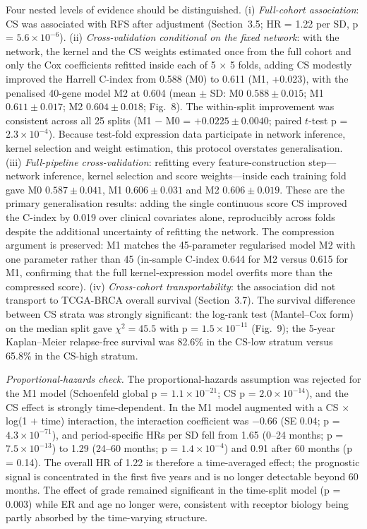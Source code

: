 \documentclass[12pt]{article}
\begin{document}
Four nested levels of evidence should be distinguished. (i)
\emph{Full-cohort association}: CS was associated with RFS after adjustment
(Section~3.5; HR = 1.22 per SD, p = $5.6\times10^{-6}$). (ii)
\emph{Cross-validation conditional on the fixed network}: with the network,
the kernel and the CS weights estimated once from the full cohort and only
the Cox coefficients refitted inside each of 5 $\times$ 5 folds, adding CS
modestly improved the Harrell C-index from 0.588 (M0) to 0.611 (M1, +0.023),
with the penalised 40-gene model M2 at 0.604 (mean $\pm$ SD: M0 $0.588
\pm 0.015$; M1 $0.611 \pm 0.017$; M2 $0.604 \pm 0.018$; Fig.~8). The
within-split improvement was consistent across all 25 splits
(M1 $-$ M0 = $+0.0225 \pm 0.0040$; paired $t$-test p = $2.3\times10^{-4}$).
Because test-fold expression data participate in network inference, kernel
selection and weight estimation, this protocol overstates generalisation. (iii)
\emph{Full-pipeline cross-validation}: refitting every feature-construction
step---network inference, kernel selection and score weights---inside each
training fold gave M0 $0.587 \pm 0.041$, M1 $0.606 \pm 0.031$ and M2
$0.606 \pm 0.019$. These are the primary generalisation results: adding the
single continuous score CS improved the C-index by 0.019 over clinical
covariates alone, reproducibly across folds despite the additional
uncertainty of refitting the network. The compression argument is
preserved: M1 matches the 45-parameter regularised model M2 with one
parameter rather than 45 (in-sample C-index 0.644 for M2 versus 0.615 for
M1, confirming that the full kernel-expression model overfits more than the
compressed score). (iv) \emph{Cross-cohort transportability}: the
association did not transport to TCGA-BRCA overall survival
(Section~3.7). The survival
difference between CS strata was strongly significant: the log-rank test
(Mantel--Cox form) on the median split gave $\chi^2 = 45.5$ with p =
$1.5\times10^{-11}$ (Fig.~9); the 5-year Kaplan--Meier relapse-free survival
was 82.6\% in the CS-low stratum versus 65.8\% in the CS-high stratum.

\emph{Proportional-hazards check.} The proportional-hazards assumption was
rejected for the M1 model (Schoenfeld global p = $1.1\times10^{-21}$; CS
p = $2.0\times10^{-14}$), and the CS effect is strongly time-dependent. In the M1
model augmented with a CS $\times$ log(1 $+$ time) interaction, the
interaction coefficient was $-0.66$ (SE 0.04; p = $4.3\times10^{-71}$),
and period-specific HRs per SD fell from 1.65 (0--24 months; p =
$7.5\times10^{-13}$) to 1.29 (24--60 months; p = $1.4\times10^{-4}$) and
0.91 after 60 months (p = 0.14). The overall HR of 1.22 is therefore a
time-averaged effect; the prognostic signal is concentrated in the first
five years and is no longer detectable beyond 60 months. The effect of
grade remained significant in the time-split model (p = 0.003) while ER and
age no longer were, consistent with receptor biology being partly absorbed
by the time-varying structure.
\end{document}
